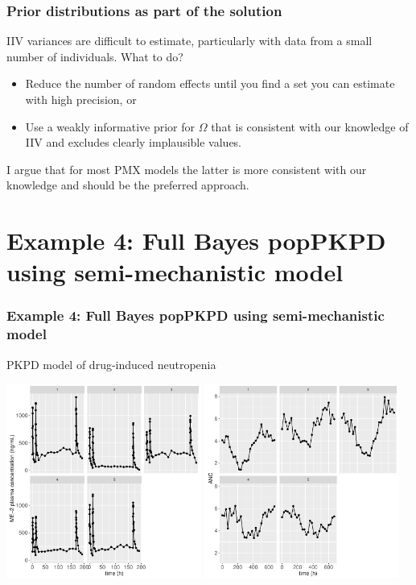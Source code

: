 \documentclass[handout]{beamer}
\begin{document}
\begin{frame}
  \frametitle{Prior distributions as part of the solution}
  
IIV variances are difficult to estimate, particularly with
    data from a small number of individuals. What to do?
  \begin{itemize}
  \item Reduce the number of random effects until you find a set you
    can estimate with high precision, or
\item Use a weakly informative prior for $\Omega$ that is consistent
  with our knowledge of IIV and excludes clearly
  implausible values.
  \end{itemize}
I argue that for most PMX models the latter is more consistent with
our knowledge and should be the preferred approach.



\end{frame}





\section{Example 4: Full Bayes popPKPD using semi-mechanistic model}

\begin{frame}
  \frametitle{Example 4: Full Bayes popPKPD using semi-mechanistic
    model}
  
PKPD model of drug-induced neutropenia

\begin{center}
\includegraphics[width=0.48\textwidth]{graphics/neutropenia1TorstenNcpPlots001.pdf}
\includegraphics[width=0.48\textwidth]{graphics/neutropenia1TorstenNcpPlots002.pdf}
\end{center}

\end{frame}
\end{document}
